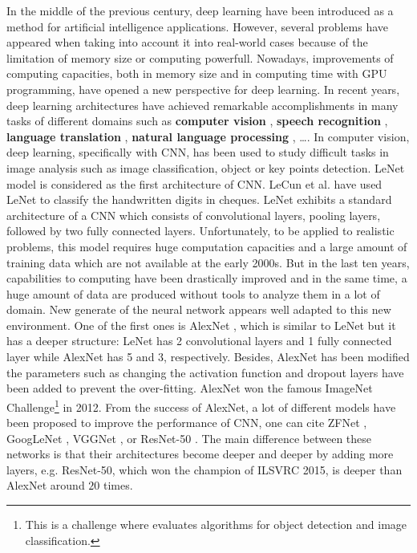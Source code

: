 \documentclass[review]{elsarticle}
\begin{document}
In the middle of the previous century, deep learning \cite{lecun2015deep} have been introduced as a method for artificial intelligence applications. However, several problems have appeared when taking into account it into real-world cases because of the limitation of memory size or computing powerfull. Nowadays, improvements of computing capacities, both in memory size and in computing time with GPU programming, have opened a new perspective for deep learning. In recent years, deep learning architectures have achieved remarkable accomplishments in many tasks of different domains such as \textbf{computer vision} \cite{lecun1998gradient, krizhevsky2012imagenet,  szegedy2015going,farabet2013learning,li2015convolutional}, \textbf{speech recognition} \cite{mikolov2011strategies, hinton2012deep}, \textbf{language translation} \cite{jean2014using, sutskever2014sequence}, \textbf{natural language processing} \cite{lecun2015deep, collobert2011natural, collobert2008unified}, \ldots. In computer vision, deep learning, specifically with CNN, has been used to study difficult tasks in image analysis such as image classification, object or key points detection. LeNet \cite{lecun1998gradient} model is considered as the first architecture of CNN. LeCun et al. \cite{lecun1998gradient} have used LeNet to classify the handwritten digits in cheques. LeNet exhibits a standard architecture of a CNN which consists of convolutional layers, pooling layers, followed by two fully connected layers. Unfortunately, to be applied to realistic problems, this model requires huge computation capacities and a large amount of training data which are not available at the early 2000s. But in the last ten years, capabilities to computing have been drastically improved and in the same time, a huge amount of data are produced without tools to analyze them in a lot of domain. New generate of the neural network appears well adapted to this new environment. One of the first ones is AlexNet \cite{krizhevsky2012imagenet}, which is similar to LeNet \cite{lecun1998gradient} but it has a deeper structure: LeNet has 2 convolutional layers and 1 fully connected layer while AlexNet has 5 and 3, respectively. Besides, AlexNet has been modified the parameters such as changing the activation function and dropout layers have been added to prevent the over-fitting. AlexNet won the famous ImageNet Challenge\footnote{This is a challenge where evaluates algorithms for object detection and image classification.} in 2012. From the success of AlexNet, a lot of different models have been proposed to improve the performance of CNN, one can cite ZFNet  \cite{zeiler2014visualizing}, GoogLeNet \cite{szegedy2015going}, VGGNet \cite{simonyan2014very}, or ResNet-50 \cite{he2016deep}. The main difference between these networks is that their architectures become deeper and deeper by adding more layers, e.g. ResNet-50, which won the champion of ILSVRC 2015, is deeper than AlexNet around $20$ times.
 
\end{document}
